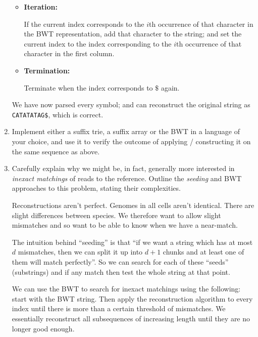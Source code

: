 \documentclass[10pt,\jkfside,a4paper]{article}
\begin{document}
\begin{enumerate}
\begin{itemize}
        \item \textbf{Iteration:}

        If the current index corresponds to the $i$th occurrence of that character in the BWT representation, add that character to the string; and set the current index to the index corresponding to the $i$th
        occurrence of that character in the first column.

        \item \textbf{Termination:}

        Terminate when the index corresponds to $\$$ again.

    \end{itemize}

    We have now parsed every symbol; and can reconstruct the original string as \texttt{CATATATAG\$}, which is correct.

    \item Implement either a suffix trie, a suffix array or the BWT in a language of your choice, and use it to verify the outcome of applying / constructing it on the same sequence as above.

    

    

    

    \item Carefully explain why we might be, in fact, generally more interested in \textit{inexact matchings} of reads to the reference. Outline the \textit{seeding} and BWT approaches to this problem, stating
    their complexities.

    Reconstructions aren't perfect. Genomes in all cells aren't identical. There are slight differences between species. We therefore want to allow slight mismatches and so want to be able to know when we have a
    near-match.

    The intuition behind ``seeding'' is that ``if we want a string which has at most $d$ mismatches, then we can split it up into $d + 1$ chunks and at least one of them will  match perfectly''. So we can search
    for each of these ``seeds'' (substrings) and if any match then test the whole string at that point.

    We can use the BWT to search for inexact matchings using the following: start with the BWT string. Then apply the reconstruction algorithm to every index until there is more than a certain threshold of
    mismatches. We essentially reconstruct all subsequences of increasing length until they are no longer good enough.

\end{enumerate}
\end{document}
